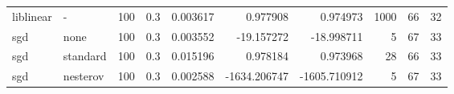 \begin{tabular}{llllrrrrrr}
liblinear &        - & 100 &     0.3 &  0.003617 &     0.977908 &     0.974973 &    1000 &          66 &        32 \\
      sgd &     none & 100 &     0.3 &  0.003552 &   -19.157272 &   -18.998711 &       5 &          67 &        33 \\
      sgd & standard & 100 &     0.3 &  0.015196 &     0.978184 &     0.973968 &      28 &          66 &        33 \\
      sgd & nesterov & 100 &     0.3 &  0.002588 & -1634.206747 & -1605.710912 &       5 &          67 &        33 \\
\bottomrule
\end{tabular}
